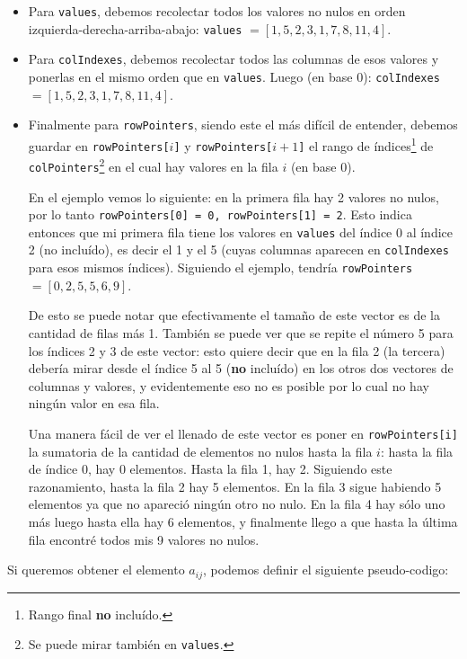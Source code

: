 	\begin{itemize} 
 \item Para \texttt{values}, debemos recolectar todos los valores no nulos en orden izquierda-derecha-arriba-abajo: \texttt{values} $= [1,5,2,3,1,7,8,11,4].$

 \item Para \texttt{colIndexes}, debemos recolectar todos las columnas de esos valores y ponerlas en el mismo orden que en \texttt{values}. Luego (en base 0): \texttt{colIndexes} $= [1,5,2,3,1,7,8,11,4].$

 \item Finalmente para \texttt{rowPointers}, siendo este el más difícil de entender, debemos guardar en \texttt{rowPointers[$i$]} y \texttt{rowPointers[$i+1$]} el rango de índices\footnote{Rango final \textbf{no} incluído.} de \texttt{colPointers}\footnote{Se puede mirar también en \texttt{values}.} en el cual hay valores en la fila $i$ (en base 0). 
 
 En el ejemplo vemos lo siguiente: en la primera fila hay 2 valores no nulos, por lo tanto \texttt{rowPointers[0] = 0, rowPointers[1] = 2}. Esto indica entonces que mi primera fila tiene los valores en \texttt{values} del índice 0 al índice 2 (no incluído), es decir el 1 y el 5 (cuyas columnas aparecen en \texttt{colIndexes} para esos mismos índices). Siguiendo el ejemplo, tendría \texttt{rowPointers} $ = [0,2,5,5,6,9]$. 
 
 De esto se puede notar que efectivamente el tamaño de este vector es de la cantidad de filas más 1. También se puede ver que se repite el número 5 para los índices 2 y 3 de este vector: esto quiere decir que en la fila 2 (la tercera) debería mirar desde el índice 5 al 5 (\textbf{no} incluído) en los otros dos vectores de columnas y valores, y evidentemente eso no es posible por lo cual no hay ningún valor en esa fila.
 
 Una manera fácil de ver el llenado de este vector es poner en \texttt{rowPointers[i]} la sumatoria de la cantidad de elementos no nulos hasta la fila $i$: hasta la fila de índice 0, hay 0 elementos. Hasta la fila 1, hay 2. Siguiendo este razonamiento, hasta la fila 2 hay 5 elementos. En la fila 3 sigue habiendo 5 elementos ya que no apareció ningún otro no nulo. En la fila 4 hay sólo uno más luego hasta ella hay 6 elementos, y finalmente llego a que hasta la última fila encontré todos mis 9 valores no nulos.
		\end{itemize}

	Si queremos obtener el elemento $a_{ij}$, podemos definir el siguiente pseudo-codigo:

